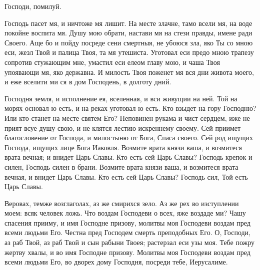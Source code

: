 \begin{mymulticols}


\MolitvamiSviatyhOtecNashih

\TsariuNebesnyj

\TrisviatoePoOtcheNash

Господи, помилуй.

\priiditepoklonimsia


Господь пасет мя, и ничтоже мя лишит. На месте злачне, тамо всели мя, на воде покойне воспита мя. Душу мою обрати, настави мя на стези правды, имене ради Своего. Аще бо и пойду посреде сени смертныя, не убоюся зла, яко Ты со мною еси, жезл Твой и палица Твоя, та мя утешиста. Уготовал еси предо мною трапезу сопротив стужающим мне, умастил еси елеом главу мою, и чаша Твоя упоявающи мя, яко державна. И милость Твоя поженет мя вся дни живота моего, и еже вселити ми ся в дом Господень, в долготу дний.


Господня земля, и исполнение ея, вселенная, и вси живущии на ней. Той на морях основал ю есть, и на реках уготовал ю есть. Кто взыдет на гору Господню? Или кто станет на месте святем Его? Неповинен рукама и чист сердцем, иже не прият всуе душу свою, и не клятся лестию искреннему своему. Сей приимет благословение от Господа, и милостыню от Бога, Спаса своего. Сей род ищущих Господа, ищущих лице Бога Иаковля. Возмите врата князи ваша, и возмитеся врата вечная; и внидет Царь Славы. Кто есть сей Царь Славы? Господь крепок и силен, Господь силен в брани. Возмите врата князи ваша, и возмитеся врата вечная, и внидет Царь Славы. Кто есть сей Царь Славы? Господь сил, Той есть Царь Славы.


Веровах, темже возглаголах, аз же смирихся зело. Аз же рех во изступлении моем: всяк человек ложь. Что воздам Господеви о всех, яже воздаде ми? Чашу спасения прииму, и имя Господне призову, молитвы моя Господеви воздам пред всеми людьми Его. Честна пред Господем смерть преподобных Его. О, Господи, аз раб Твой, аз раб Твой и сын рабыни Твоея; растерзал еси узы моя. Тебе пожру жертву хвалы, и во имя Господне призову. Молитвы моя Господеви воздам пред всеми людьми Его, во дворех дому Господня, посреди тебе, Иерусалиме.


\end{mymulticols}
